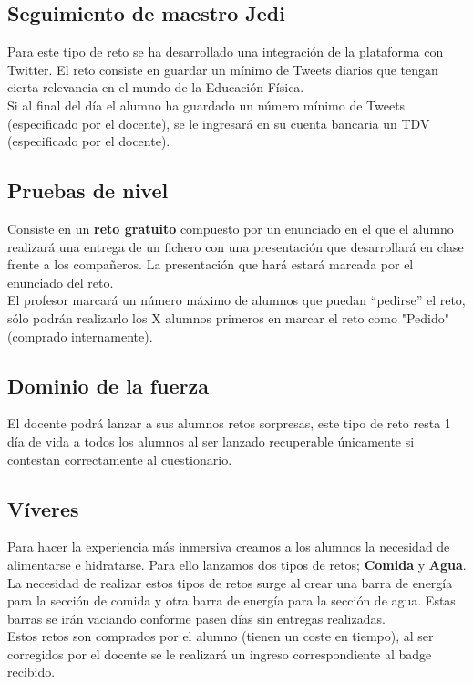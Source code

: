 \subsection{Seguimiento de maestro Jedi}
Para este tipo de reto se ha desarrollado una integración de la plataforma con Twitter. El reto consiste en guardar un mínimo de Tweets diarios que tengan cierta relevancia en el mundo de la Educación Física.\\

Si al final del día el alumno ha guardado un número mínimo de Tweets (especificado por el docente), se le ingresará en su cuenta bancaria un TDV (especificado por el docente).

\subsection{Pruebas de nivel}
Consiste en un \textbf{reto gratuito} compuesto por un enunciado en el que el alumno realizará una entrega de un fichero con una presentación que desarrollará en clase frente a los compañeros. La presentación que hará estará marcada por el enunciado del reto.\\

El profesor marcará un número máximo de alumnos que puedan ``pedirse'' el reto, sólo podrán realizarlo los X alumnos primeros en marcar el reto como "Pedido" (comprado internamente).

\subsection{Dominio de la fuerza}
El docente podrá lanzar a sus alumnos retos sorpresas, este tipo de reto resta 1 día de vida a todos los alumnos al ser lanzado recuperable únicamente si contestan correctamente al cuestionario.

\subsection{Víveres}
Para hacer la experiencia más inmersiva creamos a los alumnos la necesidad de alimentarse e hidratarse. Para ello lanzamos dos tipos de retos; \textbf{Comida} y \textbf{Agua}. La necesidad de realizar estos tipos de retos surge al crear una barra de energía para la sección de comida y otra barra de energía para la sección de agua. Estas barras se irán vaciando conforme pasen días sin entregas realizadas.\\

Estos retos son comprados por el alumno (tienen un coste en tiempo), al ser corregidos por el docente se le realizará un ingreso correspondiente al badge recibido.\\

